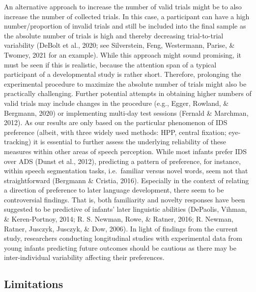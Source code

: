\documentclass[
  man,floatsintext]{apa6}
\begin{document}
An alternative approach to increase the number of valid trials might be to also increase the number of collected trials. In this case, a participant can have a high number/proportion of invalid trials and still be included into the final sample as the absolute number of trials is high and thereby decreasing trial-to-trial variability (DeBolt et al., 2020; see Silverstein, Feng, Westermann, Parise, \& Twomey, 2021 for an example). While this approach might sound promising, it must be seen if this is realistic, because the attention span of a typical participant of a developmental study is rather short. Therefore, prolonging the experimental procedure to maximize the absolute number of trials might also be practically challenging. Further potential attempts in obtaining higher numbers of valid trials may include changes in the procedure (e.g., Egger, Rowland, \& Bergmann, 2020) or implementing multi-day test sessions (Fernald \& Marchman, 2012).
As our results are only based on the particular phenomenon of IDS preference (albeit, with three widely used methods: HPP, central fixation; eye-tracking) it is essential to further assess the underlying reliability of these measures within other areas of speech perception. While most infants prefer IDS over ADS (Dunst et al., 2012), predicting a pattern of preference, for instance, within speech segmentation tasks, i.e.~familiar versus novel words, seem not that straightforward (Bergmann \& Cristia, 2016). Especially in the context of relating a direction of preference to later language development, there seem to be controversial findings. That is, both familiarity and novelty responses have been suggested to be predictive of infants' later linguistic abilities (DePaolis, Vihman, \& Keren-Portnoy, 2014; R. S. Newman, Rowe, \& Ratner, 2016; R. Newman, Ratner, Jusczyk, Jusczyk, \& Dow, 2006). In light of findings from the current study, researchers conducting longitudinal studies with experimental data from young infants predicting future outcomes should be cautious as there may be inter-individual variability affecting their preferences.

\hypertarget{limitations}{%
\subsection{Limitations}\label{limitations}}
\end{document}
